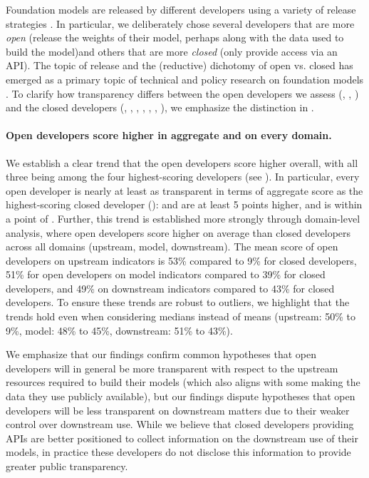 \documentclass[screen, authorversion, acmsmall]{acmart}
\begin{document}
Foundation models are released by different developers using a variety of release strategies \citep{liang2022community-norms, solaiman2023gradient}.
In particular, we deliberately chose several developers that are more \textit{open} (\eg release the weights of their model, perhaps along with the data used to build the model)and others that are more \textit{closed} (\eg only provide access via an API).
The topic of release and the (reductive) dichotomy of open vs. closed has emerged as a primary topic of technical and policy research on foundation models \citep{solaiman2019release, sastry2021release, shevlane2022structured, liang2022community-norms, liang2022condemning, solaiman2023gradient, widder2023open, seger2023open}.
To clarify how transparency differs between the open developers we assess (\ie \meta, \huggingface, \stability) and the closed developers (\ie \openai, \google, \anthropic, \cohere, \aitwentyone, \inflection, \amazon), we emphasize the distinction in . 

\paragraph{Open developers score higher in aggregate and on every domain.}
We establish a clear trend that the open developers score higher overall, with all three being among the four highest-scoring developers (see ).
In particular, every open developer is nearly at least as transparent in terms of aggregate score as the highest-scoring closed developer (\openai): \meta and \huggingface are at least 5 points higher, and \stability is within a point of \openai.
Further, this trend is established more strongly through domain-level analysis, where open developers score higher on average than closed developers across all domains (\ie upstream, model, downstream).
The mean score of open developers on upstream indicators is 53\% compared to 9\% for closed developers, 51\% for open developers on model indicators compared to 39\% for closed developers, and 49\% on downstream indicators compared to 43\% for closed developers.
To ensure these trends are robust to outliers, we highlight that the trends hold even when considering medians instead of means (upstream: 50\% to 9\%, model: 48\% to 45\%, downstream: 51\% to 43\%).

We emphasize that our findings confirm common hypotheses that open developers will in general be more transparent with respect to the upstream resources required to build their models (which also aligns with some making the data they use publicly available), but our findings dispute hypotheses that open developers will be less transparent on downstream matters due to their weaker control over downstream use.
While we believe that closed developers providing APIs are better positioned to collect information on the downstream use of their models, in practice these developers do not disclose this information to provide greater public transparency.
\end{document}
